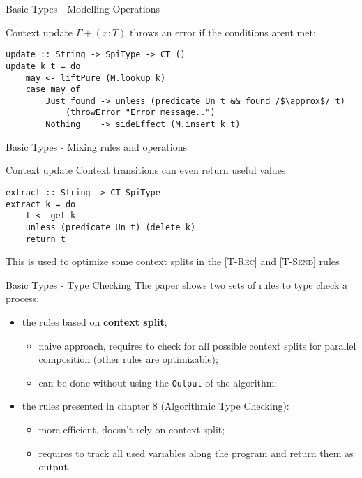 \begin{frame}[fragile]{Basic Types - Modelling Operations}

    \begin{exampleblock}{Context update}
        $\Gamma + (x : T)$ throws an error if the conditions arent met:
        \small\begin{verbatim}
update :: String -> SpiType -> CT ()
update k t = do
    may <- liftPure (M.lookup k)
    case may of
        Just found -> unless (predicate Un t && found /$\approx$/ t) 
            (throwError "Error message..")
        Nothing    -> sideEffect (M.insert k t)
        \end{verbatim}
    \end{exampleblock}
    
\end{frame}


\begin{frame}[fragile]{Basic Types - Mixing rules and operations}

    \begin{exampleblock}{Context update}
        Context transitions can even return useful values:
        \small\begin{verbatim}
extract :: String -> CT SpiType
extract k = do
    t <- get k
    unless (predicate Un t) (delete k)
    return t
        \end{verbatim}
    \end{exampleblock}

    This is used to optimize some context splits in the [\textsc{T-Rec}] and [\textsc{T-Send}] rules

\end{frame}

\begin{frame}{Basic Types - Type Checking}
    The paper shows two sets of rules to type check a process:
    \begin{itemize}
        \item the rules based on \textbf{context split};
        \begin{itemize}
            \item naive approach, requires to check for all possible context splits for parallel composition (other rules are optimizable);
            \item can be done without using the \texttt{Output} of the algorithm;
        \end{itemize}
        \item the rules presented in chapter 8 (Algorithmic Type Checking):
        \begin{itemize}
            \item more efficient, doesn't rely on context split;
            \item requires to track all used variables along the program and return them as output.
        \end{itemize}
    \end{itemize}
\end{frame}

